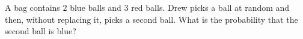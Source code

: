 A bag contains $2$ blue balls and $3$ red balls. Drew picks a ball at random and then, without replacing it, picks a second ball. What is the probability that the second ball is blue?
